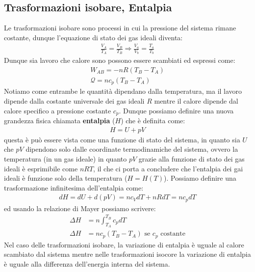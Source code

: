     \subsection{Trasformazioni isobare, Entalpia}
        Le trasformazioni isobare sono processi in cui la pressione del sistema rimane costante, dunque l'equazione di stato dei gas ideali diventa:
        \begin{align*}
            \frac{V_A}{T_A} = \frac{V_B}{T_B} \Rightarrow \frac{V_a}{V_b} = \frac{T_a}{T_b}
        \end{align*}
        Dunque sia lavoro che calore sono possono essere scambiati ed espressi come:
        \begin{align*}
            W_{AB} = -nR(T_B - T_A)\\
            \mathcal{Q} = nc_p(T_B - T_A)
        \end{align*}
        Notiamo come entrambe le quantità dipendano dalla temperatura, ma il lavoro dipende dalla costante universale dei gas ideali $R$ mentre il calore dipende dal calore specifico a pressione costante $c_p$. Dunque possiamo definire una nuova grandezza fisica chiamata \textbf{entalpia} ($H$) che è definita come:
        \begin{align}
            H = U + pV
        \end{align}
        questa è può essere vista come una funzione di stato del sistema, in quanto sia $U$ che $pV$ dipendono solo dalle coordinate termodinamiche del sistema, ovvero la temperatura (in un gas ideale) in quanto $pV$ grazie alla funzione di stato dei gas ideali è esprimibile come $nRT$, il che ci porta a concludere che l'entalpia dei gai ideali è funzione solo della temperatura ($H=H(T)$). Possiamo definire una trasformazione infinitesima dell'entalpia come:
        \begin{align*}
            dH = dU + d(pV) = nc_VdT + nRdT = nc_p dT
        \end{align*}
        ed usando la relazione di Mayer possiamo scrivere:
        \begin{align}
            \Delta H &= n \int_{T_A}^{T_B} c_p dT \nonumber\\
            \Delta H &= nc_p(T_B - T_A) \text{ se } c_p \text{ costante} \label{eq:entalpia}
        \end{align}
        Nel caso delle trasformazioni isobare, la variazione di entalpia è uguale al calore scambiato dal sistema mentre nelle trasformazioni isocore la variazione di entalpia è uguale alla differenza dell'energia interna del sistema.
